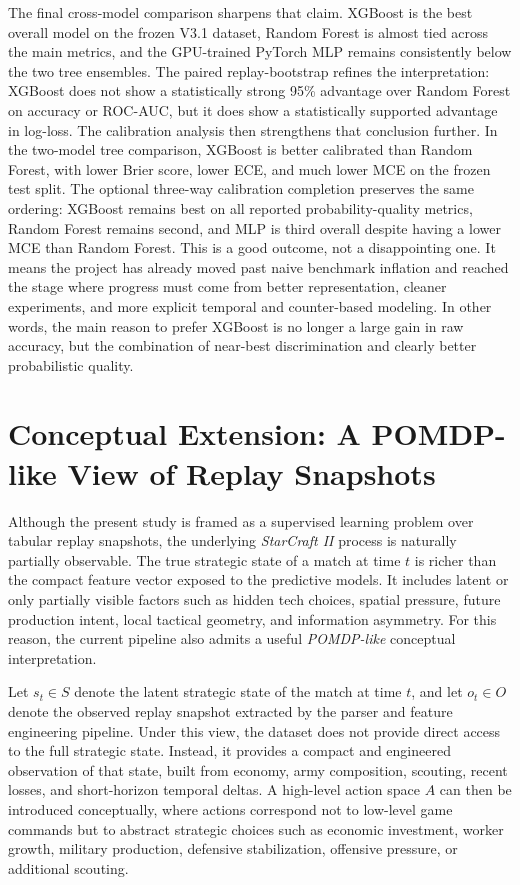 \documentclass[11pt,a4paper]{article}
\begin{document}
The final cross-model comparison sharpens that claim. XGBoost is the best overall model on the frozen V3.1 dataset, Random Forest is almost tied across the main metrics, and the GPU-trained PyTorch MLP remains consistently below the two tree ensembles. The paired replay-bootstrap refines the interpretation: XGBoost does not show a statistically strong 95\% advantage over Random Forest on accuracy or ROC-AUC, but it does show a statistically supported advantage in log-loss. The calibration analysis then strengthens that conclusion further. In the two-model tree comparison, XGBoost is better calibrated than Random Forest, with lower Brier score, lower ECE, and much lower MCE on the frozen test split. The optional three-way calibration completion preserves the same ordering: XGBoost remains best on all reported probability-quality metrics, Random Forest remains second, and MLP is third overall despite having a lower MCE than Random Forest. This is a good outcome, not a disappointing one. It means the project has already moved past naive benchmark inflation and reached the stage where progress must come from better representation, cleaner experiments, and more explicit temporal and counter-based modeling. In other words, the main reason to prefer XGBoost is no longer a large gain in raw accuracy, but the combination of near-best discrimination and clearly better probabilistic quality.

\clearpage

\section{Conceptual Extension: A POMDP-like View of Replay Snapshots}
Although the present study is framed as a supervised learning problem over tabular replay snapshots, the underlying \emph{StarCraft II} process is naturally partially observable. The true strategic state of a match at time $t$ is richer than the compact feature vector exposed to the predictive models. It includes latent or only partially visible factors such as hidden tech choices, spatial pressure, future production intent, local tactical geometry, and information asymmetry. For this reason, the current pipeline also admits a useful \emph{POMDP-like} conceptual interpretation.

Let $s_t \in S$ denote the latent strategic state of the match at time $t$, and let $o_t \in O$ denote the observed replay snapshot extracted by the parser and feature engineering pipeline. Under this view, the dataset does not provide direct access to the full strategic state. Instead, it provides a compact and engineered observation of that state, built from economy, army composition, scouting, recent losses, and short-horizon temporal deltas. A high-level action space $A$ can then be introduced conceptually, where actions correspond not to low-level game commands but to abstract strategic choices such as economic investment, worker growth, military production, defensive stabilization, offensive pressure, or additional scouting.
\end{document}
